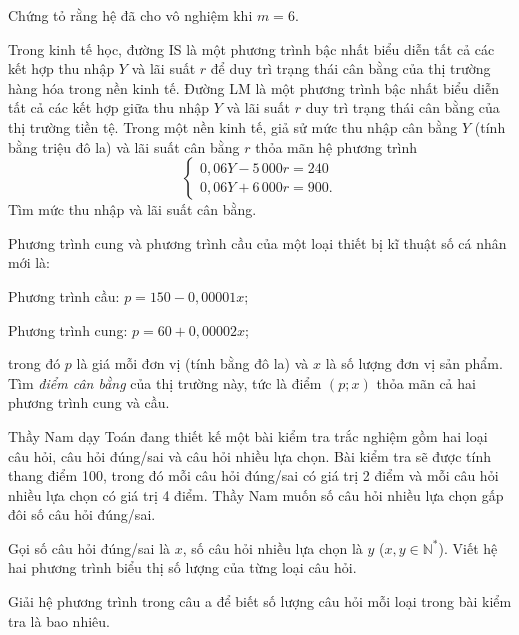 \begin{practice}
\begin{questions}[resume=SBT]
\begin{questions}
            \answerline
            \answerline

            \item Chứng tỏ rằng hệ đã cho vô nghiệm khi $m=6$.

            \answerline
            \answerline
        \end{questions}

        \item Trong kinh tế học, đường IS là một phương trình bậc nhất biểu diễn tất cả các kết hợp thu nhập $Y$ và lãi suất $r$ để duy trì trạng thái cân bằng của thị trường hàng hóa trong nền kinh tế. Đường LM là một phương trình bậc nhất biểu diễn tất cả các kết hợp giữa thu nhập $Y$ và lãi suất $r$ duy trì trạng thái cân bằng của thị trường tiền tệ. Trong một nền kinh tế, giả sử mức thu nhập cân bằng $Y$ (tính bằng triệu đô la) và lãi suất cân bằng $r$ thỏa mãn hệ phương trình
        \[
            \begin{cases}
                0{,}06Y-5\,000r=240\\
                0{,}06Y+6\,000r=900.
            \end{cases}
        \]
        Tìm mức thu nhập và lãi suất cân bằng.

        \answerline
        \answerline
        \answerline

        \item Phương trình cung và phương trình cầu của một loại thiết bị kĩ thuật số cá nhân mới là:

        Phương trình cầu: $p=150-0{,}00001x$;

        Phương trình cung: $p=60+0{,}00002x$;

        trong đó $p$ là giá mỗi đơn vị (tính bằng đô la) và $x$ là số lượng đơn vị sản phẩm. Tìm \textit{điểm cân bằng} của thị trường này, tức là điểm $(p;x)$ thỏa mãn cả hai phương trình cung và cầu.

        \answerline
        \answerline
        \answerline

        \item Thầy Nam dạy Toán đang thiết kế một bài kiểm tra trắc nghiệm gồm hai loại câu hỏi, câu hỏi đúng/sai và câu hỏi nhiều lựa chọn. Bài kiểm tra sẽ được tính thang điểm 100, trong đó mỗi câu hỏi đúng/sai có giá trị 2 điểm và mỗi câu hỏi nhiều lựa chọn có giá trị 4 điểm. Thầy Nam muốn số câu hỏi nhiều lựa chọn gấp đôi số câu hỏi đúng/sai.
        \begin{questions}
            \item Gọi số câu hỏi đúng/sai là $x$, số câu hỏi nhiều lựa chọn là $y$ ($x,y\in\mathbb{N}^{*}$). Viết hệ hai phương trình biểu thị số lượng của từng loại câu hỏi.

            \answerline
            \answerline

            \item Giải hệ phương trình trong câu a để biết số lượng câu hỏi mỗi loại trong bài kiểm tra là bao nhiêu.

            \answerline
            \answerline
        \end{questions}
    \end{questions}
\end{practice}